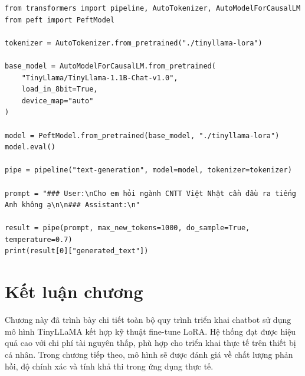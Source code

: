 \documentclass[../DoAn.tex]{subfiles}
\begin{document}
\begin{lstlisting}
from transformers import pipeline, AutoTokenizer, AutoModelForCausalLM
from peft import PeftModel

tokenizer = AutoTokenizer.from_pretrained("./tinyllama-lora")

base_model = AutoModelForCausalLM.from_pretrained(
    "TinyLlama/TinyLlama-1.1B-Chat-v1.0",
    load_in_8bit=True,
    device_map="auto"
)

model = PeftModel.from_pretrained(base_model, "./tinyllama-lora")
model.eval()

pipe = pipeline("text-generation", model=model, tokenizer=tokenizer)

prompt = "### User:\nCho em hỏi ngành CNTT Việt Nhật cần đầu ra tiếng Anh không ạ\n\n### Assistant:\n"

result = pipe(prompt, max_new_tokens=1000, do_sample=True, temperature=0.7)
print(result[0]["generated_text"])
\end{lstlisting}

\section{Kết luận chương}

Chương này đã trình bày chi tiết toàn bộ quy trình triển khai chatbot sử dụng mô hình TinyLLaMA kết hợp kỹ thuật fine-tune LoRA. Hệ thống đạt được hiệu quả cao với chi phí tài nguyên thấp, phù hợp cho triển khai thực tế trên thiết bị cá nhân. Trong chương tiếp theo, mô hình sẽ được đánh giá về chất lượng phản hồi, độ chính xác và tính khả thi trong ứng dụng thực tế.
\end{document}
